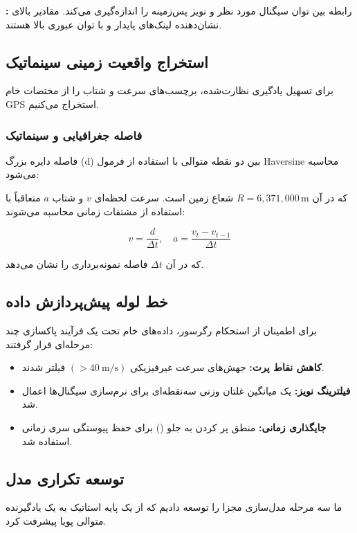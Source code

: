 \documentclass{CSICC}
\begin{document}
\textbf{:} رابطه بین توان سیگنال مورد نظر و نویز پس‌زمینه را اندازه‌گیری می‌کند. مقادیر بالای  نشان‌دهنده لینک‌های پایدار و با توان عبوری بالا هستند.


\subsection{استخراج واقعیت زمینی سینماتیک}
برای تسهیل یادگیری نظارت‌شده، برچسب‌های سرعت و شتاب را از مختصات خام GPS استخراج می‌کنیم.

\subsubsection{فاصله جغرافیایی و سینماتیک}
فاصله دایره بزرگ (d) بین دو نقطه متوالی با استفاده از فرمول Haversine محاسبه می‌شود:
\lr{
\[
d = 2R \cdot \arcsin\left(
\sqrt{
\sin^{2}\left(\frac{\Delta\phi}{2}\right)
+ \cos(\phi_{1}) \cdot \cos(\phi_{2})
\cdot \sin^{2}\left(\frac{\Delta\lambda}{2}\right)
}
\right)
\]}

که در آن \( R = 6{,}371{,}000 \,\text{m} \) شعاع زمین است.  
سرعت لحظه‌ای \( v \) و شتاب \( a \) متعاقباً با استفاده از مشتقات زمانی محاسبه می‌شوند:

\[
v = \frac{d}{\Delta t},
\quad
a = \frac{v_{t} - v_{t-1}}{\Delta t}
\]

که در آن \( \Delta t \) فاصله نمونه‌برداری را نشان می‌دهد.

\subsection{خط لوله پیش‌پردازش داده}

برای اطمینان از استحکام رگرسور، داده‌های خام تحت یک فرآیند پاکسازی چند مرحله‌ای قرار گرفتند:

\begin{itemize}
\item \textbf{کاهش نقاط پرت:}
جهش‌های سرعت غیرفیزیکی \( (>40~\text{m/s}) \) فیلتر شدند.

\item \textbf{فیلترینگ نویز:}
یک میانگین غلتان وزنی سه‌نقطه‌ای برای نرم‌سازی سیگنال‌ها اعمال شد.

\item \textbf{جایگذاری زمانی:}
منطق پر کردن به جلو () برای حفظ پیوستگی سری زمانی استفاده شد.


\end{itemize}

\subsection{توسعه تکراری مدل}
ما سه مرحله مدل‌سازی مجزا را توسعه دادیم که از یک پایه استاتیک به یک یادگیرنده متوالی پویا پیشرفت کرد.
\end{document}
